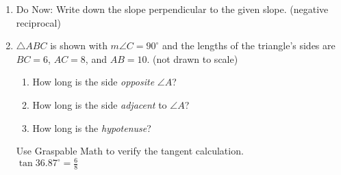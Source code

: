 \begin{enumerate}
\item Do Now: Write down the slope perpendicular to the given slope. (negative reciprocal) \vspace{0.5cm}
\begin{enumerate}
\end{enumerate}

\item $\triangle ABC$ is shown with $m\angle C=90^\circ$ and the lengths of the triangle's sides are $BC=6$, $AC=8$, and $AB=10$. (not drawn to scale)
  \begin{multicols}{2}
    \begin{enumerate}
      \item How long is the side \emph{opposite} $\angle A$? \vspace{0.75cm}
      \item How long is the side \emph{adjacent} to $\angle A$? \vspace{0.75cm}
      \item How long is the \emph{hypotenuse}? \vspace{0.75cm}
    \end{enumerate}
    \end{multicols}
    Use Graspable Math to verify the tangent calculation.\\[0.25cm]
      $\displaystyle \tan 36.87^\circ = \frac{6}{8}$


\end{enumerate}
